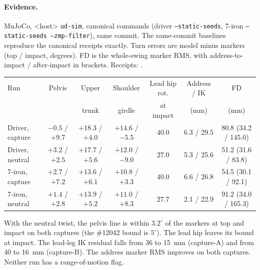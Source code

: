 \documentclass[11pt]{article}
\begin{document}
\paragraph{Evidence.} MuJoCo, <host> \texttt{ud-sim}, canonical
commands (driver \texttt{--static-seeds}, 7-iron \texttt{--static-seeds
--zmp-filter}), same commit. The same-commit baselines reproduce the canonical
receipts exactly. Turn errors are model minus markers (top / impact, degrees).
FD is the whole-swing marker RMS, with address-to-impact / after-impact in
brackets. Receipts: .

\begin{center}
\footnotesize
\setlength{\tabcolsep}{3pt}
\begin{tabular}{lcccccc}
\toprule
Run & Pelvis & Upper & Shoulder & Lead hip rot. & Address / IK & FD \\
 & & trunk & girdle & at impact & (mm) & (mm) \\
\midrule
Driver, capture & $-0.5$ / $+9.7$ & $+18.3$ / $+4.0$ & $+14.6$ / $-5.5$ & $40.0$ & 6.3 / 29.5 & 80.8 (34.2 / 145.0) \\
Driver, neutral & $+3.2$ / $+2.5$ & $+17.7$ / $+5.6$ & $+12.0$ / $-9.0$ & $27.0$ & 5.3 / 25.6 & 51.2 (31.6 / 83.8) \\
7-iron, capture & $+2.7$ / $+7.2$ & $+13.6$ / $+6.1$ & $+10.8$ / $+3.3$ & $40.0$ & 6.6 / 26.8 & 54.5 (30.1 / 92.1) \\
7-iron, neutral & $+1.4$ / $+2.8$ & $+13.9$ / $+5.2$ & $+11.0$ / $+8.3$ & $27.7$ & 2.1 / 22.9 & 91.2 (34.0 / 165.3) \\
\bottomrule
\end{tabular}
\end{center}

With the neutral twist, the pelvis line is within $3.2^\circ$ of the markers
at top and impact on both captures (the \#12042 bound is $5^\circ$). The lead
hip leaves its bound at impact. The lead-leg IK residual falls from 36 to
15~mm (capture-A) and from 40 to 16~mm (capture-B). The address marker RMS
improves on both captures. Neither run has a range-of-motion flag.
\end{document}
